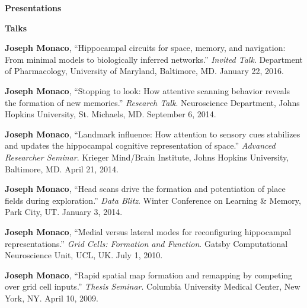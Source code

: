 \documentclass[10pt]{article}
\begin{document}
{\large \textbf{Presentations}}

\begin{description}
\item \textbf{Talks}
\item[\quad] \textbf{Joseph Monaco}, ``Hippocampal circuits for space, memory, and navigation: From minimal models to biologically inferred networks.'' \emph{Invited Talk}. Department of Pharmacology, University of Maryland, Baltimore, MD. January 22, 2016.
\item[\quad] \textbf{Joseph Monaco}, ``Stopping to look: How attentive scanning behavior reveals the formation of new memories.'' \emph{Research Talk}. Neuroscience Department, Johns Hopkins University, St. Michaels, MD. September 6, 2014.
\item[\quad] \textbf{Joseph Monaco}, ``Landmark influence: How attention to sensory cues stabilizes and updates the hippocampal cognitive representation of space.'' \emph{Advanced Researcher Seminar}. Krieger Mind/Brain Institute, Johns Hopkins University, Baltimore, MD. April 21, 2014.
\item[\quad] \textbf{Joseph Monaco}, ``Head scans drive the formation and potentiation of place fields during exploration.'' \emph{Data Blitz}. Winter Conference on Learning \& Memory, Park City, UT. January 3, 2014.
\item[\quad] \textbf{Joseph Monaco}, ``Medial versus lateral modes for reconfiguring hippocampal representations.'' \emph{Grid Cells: Formation and Function}. Gatsby Computational Neuroscience Unit, UCL, UK. July 1, 2010.
\item[\quad] \textbf{Joseph Monaco}, ``Rapid spatial map formation and remapping by competing over grid cell inputs.'' \emph{Thesis Seminar}. Columbia University Medical Center, New York, NY. April 10, 2009.
\end{description}
\end{document}
